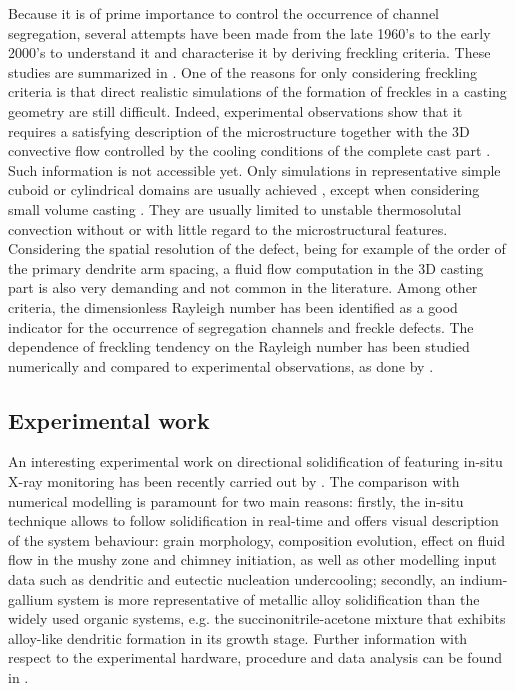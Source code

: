 Because it is of prime importance to control the occurrence of channel segregation, several attempts have been made 
from the late 1960’s \citep{flemings_macrosegregation:_1967, flemings_macrosegregation:_1968-1,flemings_macrosegregation:_1968} 
to the early 2000’s \citep{ramirez_evaluation_2003} to understand it and characterise it by deriving freckling criteria. 
These studies are summarized in \citep{auburtin_determination_1998}. One of the reasons for only considering freckling criteria 
is that direct realistic simulations of the formation of freckles in a casting geometry are still difficult. 
Indeed, experimental observations show that it requires a satisfying description of the microstructure together 
with the 3D convective flow controlled by the cooling conditions of the complete cast part \citep{shevchenko_chimney_2013}. 
Such information is not accessible yet. Only simulations in representative simple cuboid or cylindrical domains are 
usually achieved \citep{felicelli_simulation_1991,felicelli_modeling_1998,kohler_peritectic_2008,guo_three-dimensional_2003}, 
except when considering small volume casting \citep{desbiolles_micro-macrosegregation_2003}. 
They are usually limited to unstable thermosolutal convection without or with 
little regard to the microstructural features. Considering the spatial resolution of the defect, being for example of the 
order of the primary dendrite arm spacing, a fluid flow computation in the 3D casting part is also very demanding and not 
common in the literature. 
Among  other criteria, the dimensionless Rayleigh number has been identified as a good indicator 
for  the occurrence of segregation channels and freckle defects. The dependence of freckling tendency on the 
Rayleigh number has been studied numerically and compared to experimental observations, as done 
by \citep{ramirez_evaluation_2003}.


\subsection{Experimental work}  \label{sec:freckle_exp}

An interesting experimental work on directional solidification of 
featuring in-situ X-ray monitoring has been recently carried out by \citet{shevchenko_chimney_2013}. 
The comparison with numerical modelling is paramount for two main reasons: firstly, the in-situ technique allows to follow solidification in real-time 
and offers visual description of the system behaviour: grain morphology, composition evolution, effect on fluid flow in the 
mushy zone and chimney initiation, as well as other modelling input data such as dendritic and eutectic nucleation undercooling; 
secondly, an indium-gallium system is more representative of metallic alloy solidification than the widely used organic systems, 
e.g. the succinonitrile-acetone mixture that exhibits alloy-like dendritic formation in its growth stage. Further information with respect 
to the experimental hardware, procedure and data analysis can be found in \citep{boden_x-ray_2008,shevchenko_chimney_2013}.

